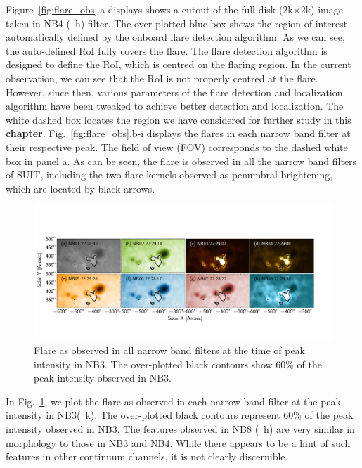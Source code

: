 Figure~\ref{fig:flare_obs}.a displays shows a cutout of the full-disk (2k$\times$2k) image taken in NB4 (~h) filter. The over-plotted blue box shows the region of interest automatically defined by the onboard flare detection algorithm. As we can see, the auto-defined RoI fully covers the flare. The flare detection algorithm is designed to define the RoI, which is centred on the flaring region. In the current observation, we can see that the RoI is not properly centred at the flare. However, since then, various parameters of the flare detection and localization algorithm have been tweaked to achieve better detection and localization. The white dashed box locates the region we have considered for further study in this {\bf chapter}. Fig.~\ref{fig:flare_obs}.{b-i} displays the flares in each narrow band filter at their respective peak. The field of view (FOV) corresponds to the dashed white box in panel a. As can be seen, the flare is observed in all the narrow band filters of SUIT, including the two flare kernels observed as penumbral brightening, which are located by black arrows. %
\begin{figure}
    \centering
    \includegraphics[trim={0.2cm 2.5cm 1cm 3.5cm},clip,width=\linewidth]{Figures/feb_22nd/suit_roi_nb3_peak.pdf}
    \caption[SUIT observation of the flare in all NB filters at NB3 peak]{Flare as observed in all narrow band filters at the time of peak intensity in NB3. The over-plotted black contours show 60\% of the peak intensity observed in NB3.}
    \label{fig:flare_nb3_peak}
\end{figure}

In Fig.~\ref{fig:flare_nb3_peak}, we plot the flare as observed in each narrow band filter at the peak intensity in NB3(~k).%
The over-plotted black contours represent 60\% of the peak intensity observed in NB3. The features observed in NB8 (~h) are very similar in morphology to those in NB3 and NB4. While there appears to be a hint of such features in other continuum channels, it is not clearly discernible. 

